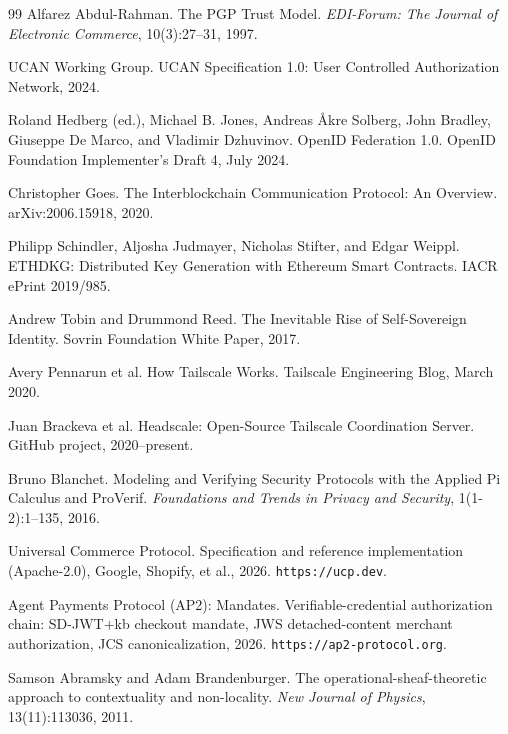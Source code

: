 \documentclass[11pt,a4paper]{article}
\theoremstyle{definition}
\theoremstyle{remark}
\begin{document}
\begin{thebibliography}{99}
Alfarez Abdul-Rahman.
\newblock The PGP Trust Model.
\newblock \textit{EDI-Forum: The Journal of Electronic Commerce}, 10(3):27--31, 1997.

UCAN Working Group.
\newblock UCAN Specification 1.0: User Controlled Authorization Network, 2024.

Roland Hedberg (ed.), Michael B. Jones, Andreas Åkre Solberg, John Bradley, Giuseppe De Marco, and Vladimir Dzhuvinov.
\newblock OpenID Federation 1.0.
\newblock OpenID Foundation Implementer's Draft 4, July 2024.

Christopher Goes.
\newblock The Interblockchain Communication Protocol: An Overview.
\newblock arXiv:2006.15918, 2020.

Philipp Schindler, Aljosha Judmayer, Nicholas Stifter, and Edgar Weippl.
\newblock ETHDKG: Distributed Key Generation with Ethereum Smart Contracts.
\newblock IACR ePrint 2019/985.

Andrew Tobin and Drummond Reed.
\newblock The Inevitable Rise of Self-Sovereign Identity.
\newblock Sovrin Foundation White Paper, 2017.

Avery Pennarun et al.
\newblock How Tailscale Works.
\newblock Tailscale Engineering Blog, March 2020.

Juan Brackeva et al.
\newblock Headscale: Open-Source Tailscale Coordination Server.
\newblock GitHub project, 2020--present.

Bruno Blanchet.
\newblock Modeling and Verifying Security Protocols with the Applied Pi Calculus and ProVerif.
\newblock \textit{Foundations and Trends in Privacy and Security}, 1(1-2):1--135, 2016.

Universal Commerce Protocol.
\newblock Specification and reference implementation (Apache-2.0), Google, Shopify, et al., 2026.
\newblock \texttt{https://ucp.dev}.

Agent Payments Protocol (AP2): Mandates.
\newblock Verifiable-credential authorization chain: SD-JWT+kb checkout mandate, JWS detached-content merchant authorization, JCS canonicalization, 2026.
\newblock \texttt{https://ap2-protocol.org}.

Samson Abramsky and Adam Brandenburger.
\newblock The operational-sheaf-theoretic approach to contextuality and non-locality.
\newblock \textit{New Journal of Physics}, 13(11):113036, 2011.


\end{thebibliography}
\end{document}
